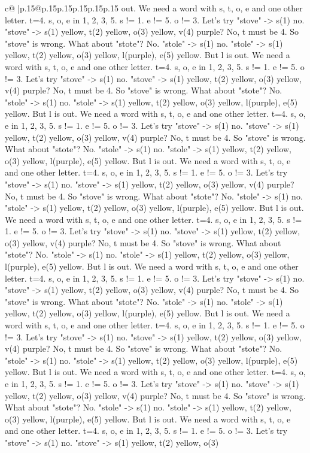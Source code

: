 \documentclass{article}
\begin{document}
{\begin{supertabular}{c@{$\;$}|p{.15\linewidth}@{}p{.15\linewidth}p{.15\linewidth}p{.15\linewidth}p{.15\linewidth}p{.15\linewidth}}
{{{out. We need a word with s, t, o, e and one other letter. t=4. s, o, e in 1, 2, 3, 5. s != 1. e != 5. o != 3. Let's try "stove" {-}> s(1) no. "stove" {-}> s(1) yellow, t(2) yellow, o(3) yellow, v(4) purple? No, t must be 4. So "stove" is wrong. What about "stote"? No. "stole" {-}> s(1) no. "stole" {-}> s(1) yellow, t(2) yellow, o(3) yellow, l(purple), e(5) yellow. But l is out. We need a word with s, t, o, e and one other letter. t=4. s, o, e in 1, 2, 3, 5. s != 1. e != 5. o != 3. Let's try "stove" {-}> s(1) no. "stove" {-}> s(1) yellow, t(2) yellow, o(3) yellow, v(4) purple? No, t must be 4. So "stove" is wrong. What about "stote"? No. "stole" {-}> s(1) no. "stole" {-}> s(1) yellow, t(2) yellow, o(3) yellow, l(purple), e(5) yellow. But l is out. We need a word with s, t, o, e and one other letter. t=4. s, o, e in 1, 2, 3, 5. s != 1. e != 5. o != 3. Let's try "stove" {-}> s(1) no. "stove" {-}> s(1) yellow, t(2) yellow, o(3) yellow, v(4) purple? No, t must be 4. So "stove" is wrong. What about "stote"? No. "stole" {-}> s(1) no. "stole" {-}> s(1) yellow, t(2) yellow, o(3) yellow, l(purple), e(5) yellow. But l is out. We need a word with s, t, o, e and one other letter. t=4. s, o, e in 1, 2, 3, 5. s != 1. e != 5. o != 3. Let's try "stove" {-}> s(1) no. "stove" {-}> s(1) yellow, t(2) yellow, o(3) yellow, v(4) purple? No, t must be 4. So "stove" is wrong. What about "stote"? No. "stole" {-}> s(1) no. "stole" {-}> s(1) yellow, t(2) yellow, o(3) yellow, l(purple), e(5) yellow. But l is out. We need a word with s, t, o, e and one other letter. t=4. s, o, e in 1, 2, 3, 5. s != 1. e != 5. o != 3. Let's try "stove" {-}> s(1) no. "stove" {-}> s(1) yellow, t(2) yellow, o(3) yellow, v(4) purple? No, t must be 4. So "stove" is wrong. What about "stote"? No. "stole" {-}> s(1) no. "stole" {-}> s(1) yellow, t(2) yellow, o(3) yellow, l(purple), e(5) yellow. But l is out. We need a word with s, t, o, e and one other letter. t=4. s, o, e in 1, 2, 3, 5. s != 1. e != 5. o != 3. Let's try "stove" {-}> s(1) no. "stove" {-}> s(1) yellow, t(2) yellow, o(3) yellow, v(4) purple? No, t must be 4. So "stove" is wrong. What about "stote"? No. "stole" {-}> s(1) no. "stole" {-}> s(1) yellow, t(2) yellow, o(3) yellow, l(purple), e(5) yellow. But l is out. We need a word with s, t, o, e and one other letter. t=4. s, o, e in 1, 2, 3, 5. s != 1. e != 5. o != 3. Let's try "stove" {-}> s(1) no. "stove" {-}> s(1) yellow, t(2) yellow, o(3) yellow, v(4) purple? No, t must be 4. So "stove" is wrong. What about "stote"? No. "stole" {-}> s(1) no. "stole" {-}> s(1) yellow, t(2) yellow, o(3) yellow, l(purple), e(5) yellow. But l is out. We need a word with s, t, o, e and one other letter. t=4. s, o, e in 1, 2, 3, 5. s != 1. e != 5. o != 3. Let's try "stove" {-}> s(1) no. "stove" {-}> s(1) yellow, t(2) yellow, o(3) yellow, v(4) purple? No, t must be 4. So "stove" is wrong. What about "stote"? No. "stole" {-}> s(1) no. "stole" {-}> s(1) yellow, t(2) yellow, o(3) yellow, l(purple), e(5) yellow. But l is out. We need a word with s, t, o, e and one other letter. t=4. s, o, e in 1, 2, 3, 5. s != 1. e != 5. o != 3. Let's try "stove" {-}> s(1) no. "stove" {-}> s(1) yellow, t(2) yellow, o(3) }}}
\end{supertabular}}
\end{document}
